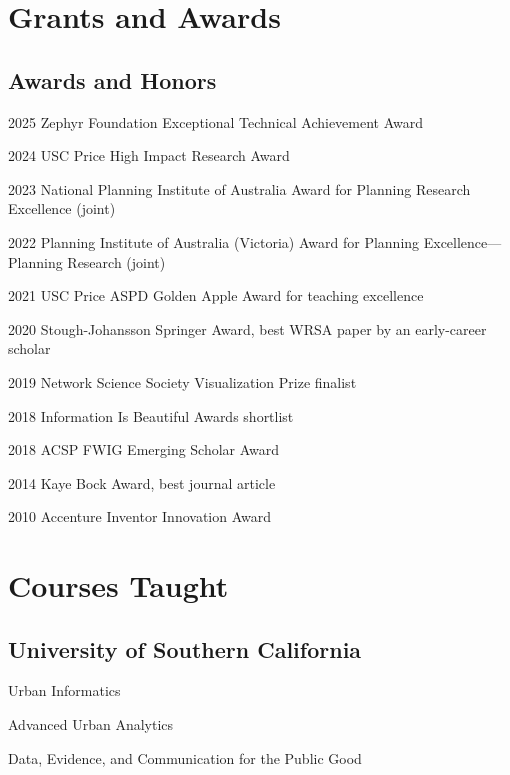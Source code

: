 \documentclass[11pt,letterpaper]{report} %
\newcommand{\listitemspace}{0.25em}
\renewenvironment{itemize}
{\begin{list}{}{\setlength{\leftmargin}{0em}
                \setlength{\parskip}{0em}
                \setlength{\itemsep}{\listitemspace}
                \setlength{\parsep}{\listitemspace}}}
{\end{list}}
\begin{document}
    \section*{Grants and Awards}

    \subsection*{Awards and Honors}

    \begin{tablist}

        \item[2025] \tab{}Zephyr Foundation Exceptional Technical Achievement Award
        \item[2024] \tab{}USC Price High Impact Research Award
        \item[2023] \tab{}National Planning Institute of Australia Award for Planning Research Excellence (joint)
        \item[2022] \tab{}Planning Institute of Australia (Victoria) Award for Planning Excellence---Planning Research (joint)
        \item[2021] \tab{}USC Price ASPD Golden Apple Award for teaching excellence
        \item[2020] \tab{}Stough-Johansson Springer Award, best WRSA paper by an early-career scholar
        \item[2019] \tab{}Network Science Society Visualization Prize finalist
        \item[2018] \tab{}Information Is Beautiful Awards shortlist
        \item[2018] \tab{}ACSP FWIG Emerging Scholar Award
        \item[2014] \tab{}Kaye Bock Award, best journal article
        \item[2010] \tab{}Accenture Inventor Innovation Award

    \end{tablist}


    \section*{Courses Taught}

    \subsection*{University of Southern California}

    \begin{itemize}

        \item Urban Informatics
        \item Advanced Urban Analytics
        \item Data, Evidence, and Communication for the Public Good

    \end{itemize}
\end{document}
